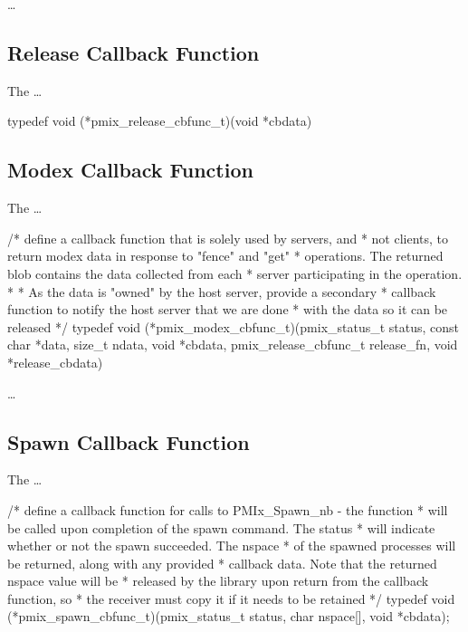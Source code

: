\ldots

\subsection{Release Callback Function}

The  \ldots

\cspecificstart
\begin{codepar}
typedef void (*pmix_release_cbfunc_t)(void *cbdata)
\end{codepar}
\cspecificend


\subsection{Modex Callback Function}

The  \ldots

\cspecificstart
\begin{codepar}
/* define a callback function that is solely used by servers, and
 * not clients, to return modex data in response to "fence" and "get"
 * operations. The returned blob contains the data collected from each
 * server participating in the operation.
 *
 * As the data is "owned" by the host server, provide a secondary
 * callback function to notify the host server that we are done
 * with the data so it can be released */
typedef void (*pmix_modex_cbfunc_t)(pmix_status_t status,
                                    const char *data, size_t ndata,
                                    void *cbdata,
                                    pmix_release_cbfunc_t release_fn,
                                    void *release_cbdata)

\end{codepar}
\cspecificend

\descr

\ldots

\subsection{Spawn Callback Function}

The  \ldots

\cspecificstart
\begin{codepar}
/* define a callback function for calls to PMIx_Spawn_nb - the function
 * will be called upon completion of the spawn command. The status
 * will indicate whether or not the spawn succeeded. The nspace
 * of the spawned processes will be returned, along with any provided
 * callback data. Note that the returned nspace value will be
 * released by the library upon return from the callback function, so
 * the receiver must copy it if it needs to be retained */
typedef void (*pmix_spawn_cbfunc_t)(pmix_status_t status,
                                    char nspace[], void *cbdata);
\end{codepar}
\cspecificend


